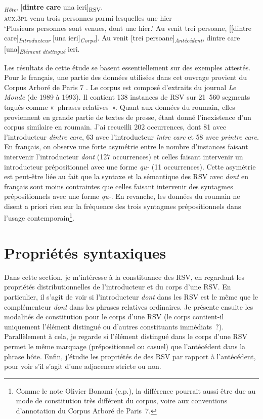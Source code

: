 \ea \label{ch3:ex7}
\ea {}
\textit{\textsubscript{Hôte}}, [\textbf{dintre} \textbf{care}  una  ieri]\textsubscript{RSV}. \label{ch3:ex7a}\\
\textsc{aux.3pl} venu  trois  personnes  parmi  lesquelles  une  hier\\
\glt ‘Plusieurs personnes sont venues, dont une hier.’
\ex
Au venit trei persoane, [[dintre care]\textit{\textsubscript{Introducteur}} [una ieri]\textit{\textsubscript{Corps}}]. \label{ch3:ex7b}
\ex
Au venit [trei persoane]\textit{\textsubscript{Antécédent}}, dintre care [una]\textit{\textsubscript{Elément distingué}} ieri. \label{ch3:ex7c}
\z
\z

Les résultats de cette étude se basent essentiellement sur des exemples attestés. Pour le français, une partie des données utilisées dans cet ouvrage provient du Corpus Arboré de Paris 7 \citep{AbeilleEtAl2003b}. Le corpus est composé d’extraits du journal \textit{Le Monde} (de 1989 à 1993). Il contient 138 instances de RSV sur 21~560 segments tagués comme «~phrases relatives~». Quant aux données du roumain, elles proviennent en grande partie de textes de presse, étant donné l’inexistence d’un corpus similaire en roumain. J’ai recueilli 202 occurrences, dont 81 avec l’introducteur \textit{dintre care}, 63 avec l’introducteur \textit{între care} et 58 avec \textit{printre care}. En français, on observe une forte asymétrie entre le nombre d’instances faisant intervenir l’introducteur \textit{dont} (127 occurrences) et celles faisant intervenir un introducteur prépositionnel avec une forme \textit{qu-} (11 occurrences). Cette asymétrie est peut-être liée au fait que la syntaxe et la sémantique des RSV avec \textit{dont} en français sont moins contraintes que celles faisant intervenir des syntagmes prépositionnels avec une forme \textit{qu-}. En revanche, les données du roumain ne disent a priori rien sur la fréquence des trois syntagmes prépositionnels dans l’usage contemporain\footnote{Comme le note Olivier Bonami (c.p.), la différence pourrait aussi être due au mode de constitution très différent du corpus, voire aux conventions d’annotation du Corpus Arboré de Paris~7.}.


\section{Propriétés syntaxiques}\label{ch3:sect3.2}

Dans cette section, je m’intéresse à la constituance des RSV, en regardant les propriétés distributionnelles de l’introducteur et du corps d’une RSV. En particulier, il s’agit de voir si l’introducteur \textit{dont} dans les RSV est le même que le complémenteur \textit{dont} dans les phrases relatives ordinaires. Je présente ensuite les modalités de constitution pour le corps d’une RSV (le corps contient-il uniquement l’élément distingué ou d’autres constituants immédiats~?). Parallèlement à cela, je regarde si l’élément distingué dans le corps d’une RSV permet le même marquage (prépositionnel ou casuel) que l’antécédent dans la phrase hôte. Enfin, j’étudie les propriétés de  des RSV par rapport à l’antécédent, pour voir s’il s’agit d’une adjacence stricte ou non.


